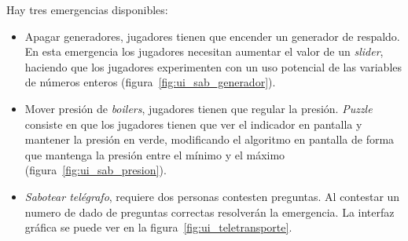 Hay tres emergencias disponibles:
\begin{itemize}
    \item Apagar generadores, jugadores tienen que encender un generador de respaldo. En esta emergencia los jugadores necesitan aumentar el valor de un \textit{slider}, haciendo que los jugadores experimenten con un uso potencial de las variables de números enteros (figura~\ref{fig:ui_sab_generador}).
    \item Mover presión de \textit{boilers}, jugadores tienen que regular la presión. \textit{Puzzle} consiste en que los jugadores tienen que ver el indicador en pantalla y mantener la presión en verde, modificando el algoritmo en pantalla de forma que mantenga la presión entre el mínimo y el máximo (figura~\ref{fig:ui_sab_presion}).
    \item \textit{Sabotear telégrafo}, requiere dos personas contesten preguntas. Al contestar un numero de dado de preguntas correctas resolverán la emergencia. La interfaz gráfica se puede ver en la figura~\ref{fig:ui_teletransporte}.
\end{itemize}

